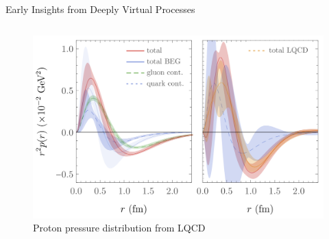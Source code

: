 \documentclass[aspectratio=169]{beamer}
\newcommand*{\myfont}{\fontfamily{lmtt}\selectfont}
\begin{document}
\begin{frame}{Early Insights from Deeply Virtual Processes}
\begin{columns}
    \begin{minipage}[c][0.6\textheight][c]{\linewidth}
        \begin{figure}
            \centering
            \includegraphics[width=.8795\textwidth]{defense/proton_pressure_theory.png}
            \caption{ Proton pressure distribution from LQCD\\
            {\myfont{\tiny [P.E. Shanahan and W. Detmold, Phys. Rev. Lett. 2019]}}}
        \end{figure}
    \end{minipage}

\end{columns}
\end{frame}
\end{document}
